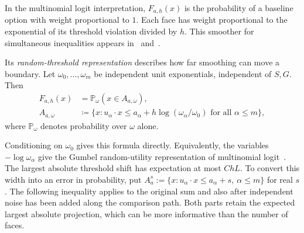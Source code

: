\documentclass[11pt,letterpaper]{article}
\theoremstyle{remark}
\newcommand{\Pp}{\mathbb P}
\begin{document}
In the multinomial logit interpretation, \(F_{a,h}(x)\) is the probability
of a baseline option with weight proportional to \(1\). Each face has
weight proportional to the exponential of its threshold violation divided
by \(h\). This smoother for simultaneous inequalities appears
in~\cite[p.~1001]{McFadden1989} and~\cite[eq.~(5)]{GaoZhang}.

Its \emph{random-threshold representation} describes how far smoothing
can move a boundary. Let \(\omega_0,\ldots,\omega_m\) be independent
unit exponentials, independent of \(S,G\). Then
\begin{equation}
 \begin{split}
 F_{a,h}(x)&=\Pp_\omega(x\in A_{a,\omega}),\\
 A_{a,\omega}&\coloneqq\{x:u_\alpha\cdot x\le
 a_\alpha+h\log(\omega_\alpha/\omega_0)
                   \text{ for all }\alpha\le m\},
 \end{split}
 \label{eq:mixture}
\end{equation}
where $\Pp_\omega$ denotes probability over $\omega$ alone. 

Conditioning on \(\omega_0\) gives this formula directly. Equivalently,
the variables \(-\log\omega_\alpha\) give the Gumbel random-utility
representation of multinomial logit~\cite[Section~2.6]{Yellott1977}.
The largest absolute threshold shift has expectation at most \(ChL\).
To convert this width into an error in probability, put
\(A_a^s:=\{x:u_\alpha\cdot x\le a_\alpha+s,\ \alpha\le m\}\) for
real \(s\). The following inequality applies to the original sum and
also after independent noise has been added along the comparison path.
Both parts retain the expected largest absolute projection, which
can be more informative than the number of faces.
\end{document}
